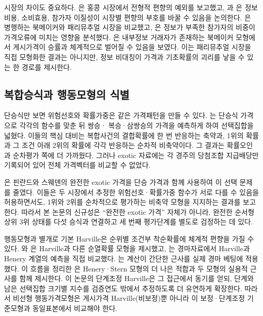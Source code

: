시장의 차이도 중요하다. \citet{buschehall1988}은 홍콩 시장에서 전형적
편향의 예외를 보고했고, \citet{vaughanwilliams1997}과
\citet{vaughanwilliams1998}은 정보비용, 소비효용, 참가자 이질성이 시장별
편향의 부호를 바꿀 수 있음을 논의한다. \citet{brucejohnson2000}은 병행하는
북메이커와 패리뮤추얼 시장을 비교했고, \citet{sungjohnsonpeirson2012}은
정보가 부족한 참가자의 비중이 가격오류에 미치는 영향을 분석했다.
\citet{shin1991}은 내부정보 거래자가 존재하는 북메이커 모형에서 게시가격이
승률과 체계적으로 벌어질 수 있음을 보였다. 이는 패리뮤추얼 시장을 직접
모형화한 결과는 아니지만, 정보 비대칭이 가격과 기초확률의 괴리를 낳을 수
있는 한 경로를 제시한다.

\subsection{복합승식과 행동모형의 식별}

단승식만 보면 위험선호와 확률가중은 같은 가격패턴을 만들 수 있다.
\citet{snowbergwolfers2010}는 단승식 가격으로 각각의 함수를 맞춘 뒤 쌍승·
복승·삼쌍승의 가격을 예측하게 하여 선택집합을 넓혔다. 이들의 핵심 대비는
복합사건의 결합확률에 한 번 반응하는 축약과, 1위의 확률과 그 조건 아래 2위의
확률에 각각 반응하는 순차적 비축약이다. 그 결과는 확률오인과 순차평가 쪽에
더 가까웠다. 그러나 exotic 자료에는 각 경주의 당첨조합 지급배당만 기록되어
있어 전체 가격벡터를 비교할 수 없었다.

\citet{koivurantakorhonen2019}은 핀란드와 스웨덴의 완전한 exotic 가격을
단승 가격과 함께 사용하여 이 선택 문제를 줄였다. 이들은 두 시장에서 추정한
위험선호·확률가중 함수가 서로 다를 수 있음을 허용하면서도, 1위와 2위를
순차적으로 평가하는 비축약 모형을 지지하는 결과를 보고한다. 따라서 본 논문의
신규성은 ``완전한 exotic 가격'' 자체가 아니라, 완전한 순서형 상위 3위 상태를
다섯 승식과 연결하고 세 번째 평가단계를 별도로 검정하는 데 있다.

행동모형과 별개로 기본 Harville은 순위별 조건부 착순확률에 체계적 편향을
가질 수 있다. \citet{henery1981}와 \citet{stern1990}은 Harville과 다른
순열확률 모형을 제시했고, \citet{lobaconshone1994}는 경마자료에서 Harville과
Henery 계열의 예측을 직접 비교했다. \citet{loetal1995}는 계산이 간단한
근사를 실제 경마 베팅에 적용했다. 이 흐름을 정리한
\citet[제3.1절, 특히 식 (7)]{lobaconshone2008}은 Henery·Stern 모형의 더 나은
적합과 두 모형의 실용적 근사를 함께 제시한다.
이 논문의 단계조정 Harville은 그 접근에서 동기를 얻되, 단계와 남은
선택집합 크기별 지수를 검증연도 밖에서 추정하도록 더 유연하게 확장한다.
따라서 비선형 행동가격모형은 게시가격 Harville(비보정)뿐 아니라 이
보정·단계조정 기준모형과
동일표본에서 비교해야 한다.

